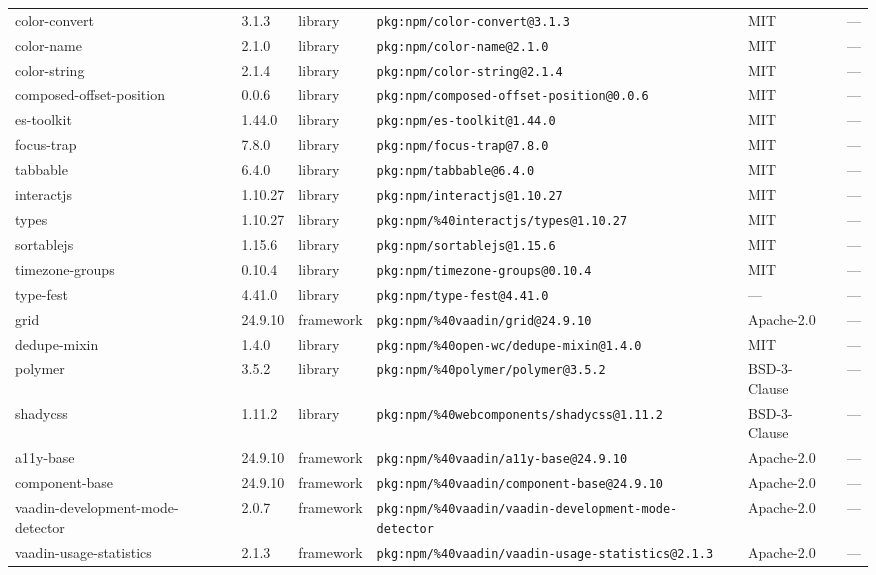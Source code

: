 \documentclass[11pt]{article}
\begin{document}
\begin{longtable}{|l|l|l|p{2.2cm}|l|p{4cm}|}
color-convert & 3.1.3 & library & \texttt{pkg:npm/color-convert@3.1.3} & MIT & — \\
color-name & 2.1.0 & library & \texttt{pkg:npm/color-name@2.1.0} & MIT & — \\
color-string & 2.1.4 & library & \texttt{pkg:npm/color-string@2.1.4} & MIT & — \\
composed-offset-position & 0.0.6 & library & \texttt{pkg:npm/composed-offset-position@0.0.6} & MIT & — \\
es-toolkit & 1.44.0 & library & \texttt{pkg:npm/es-toolkit@1.44.0} & MIT & — \\
focus-trap & 7.8.0 & library & \texttt{pkg:npm/focus-trap@7.8.0} & MIT & — \\
tabbable & 6.4.0 & library & \texttt{pkg:npm/tabbable@6.4.0} & MIT & — \\
interactjs & 1.10.27 & library & \texttt{pkg:npm/interactjs@1.10.27} & MIT & — \\
types & 1.10.27 & library & \texttt{pkg:npm/\%40interactjs/types@1.10.27} & MIT & — \\
sortablejs & 1.15.6 & library & \texttt{pkg:npm/sortablejs@1.15.6} & MIT & — \\
timezone-groups & 0.10.4 & library & \texttt{pkg:npm/timezone-groups@0.10.4} & MIT & — \\
type-fest & 4.41.0 & library & \texttt{pkg:npm/type-fest@4.41.0} & — & — \\
grid & 24.9.10 & framework & \texttt{pkg:npm/\%40vaadin/grid@24.9.10} & Apache-2.0 & — \\
dedupe-mixin & 1.4.0 & library & \texttt{pkg:npm/\%40open-wc/dedupe-mixin@1.4.0} & MIT & — \\
polymer & 3.5.2 & library & \texttt{pkg:npm/\%40polymer/polymer@3.5.2} & BSD-3-Clause & — \\
shadycss & 1.11.2 & library & \texttt{pkg:npm/\%40webcomponents/shadycss@1.11.2} & BSD-3-Clause & — \\
a11y-base & 24.9.10 & framework & \texttt{pkg:npm/\%40vaadin/a11y-base@24.9.10} & Apache-2.0 & — \\
component-base & 24.9.10 & framework & \texttt{pkg:npm/\%40vaadin/component-base@24.9.10} & Apache-2.0 & — \\
vaadin-development-mode-detector & 2.0.7 & framework & \texttt{pkg:npm/\%40vaadin/vaadin-development-mode-detector} & Apache-2.0 & — \\
vaadin-usage-statistics & 2.1.3 & framework & \texttt{pkg:npm/\%40vaadin/vaadin-usage-statistics@2.1.3} & Apache-2.0 & — \\

\end{longtable}
\end{document}
